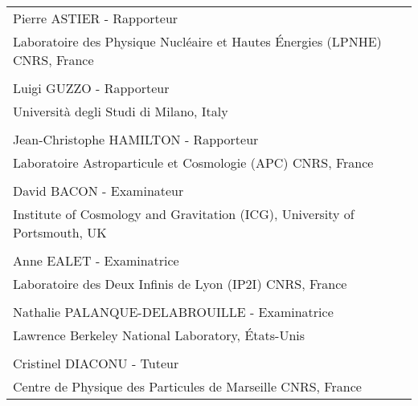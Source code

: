\begin{center}
\begin{minipage}[t]{.57\linewidth}
	    \vspace{1em}
    	{
        \begin{tabular}{p{} }
        	Pierre ASTIER - Rapporteur \\
        	Laboratoire des Physique Nucléaire et Hautes Énergies (LPNHE) CNRS, France \\
        	\\
        	Luigi GUZZO - Rapporteur \\
        	Università degli Studi di Milano, Italy \\
            \\
            Jean-Christophe HAMILTON - Rapporteur \\
        	Laboratoire Astroparticule et Cosmologie (APC) CNRS, France \\
            \\
        	David BACON - Examinateur \\
        	Institute of Cosmology and Gravitation (ICG), University of Portsmouth, UK \\
			\\
			Anne EALET - Examinatrice \\
			Laboratoire des Deux Infinis de Lyon (IP2I) CNRS, France \\
			\\
			Nathalie PALANQUE-DELABROUILLE - Examinatrice \\
			Lawrence Berkeley National Laboratory, États-Unis \\ 
            \\
        	Cristinel DIACONU - Tuteur \\
        	Centre de Physique des Particules de Marseille CNRS, France \\
        \end{tabular}
        }
	\end{minipage}\hfill
\end{center}       

\vspace{1.5em}


\restoregeometry